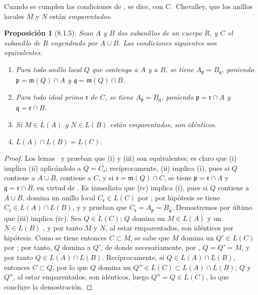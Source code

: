 \documentclass[oneside]{amsart}
\theoremstyle{ega-env-style}
\theoremstyle{ega-thm-env-style}
\newtheorem*{proposition}{Proposición}
\theoremstyle{ega-defn-env-style}
\let\EGAOriginalLabel\label
\renewcommand{\label}[1]{\phantomsection\EGAOriginalLabel{#1}}
\begin{document}
Cuando se cumplen las condiciones de , se dice, con C.~Chevalley, que los anillos locales $M$ y $N$ están \emph{emparentados}.

\begin{proposition}[8.1.5]
\label{I.8.1.5}
Sean $A$ y $B$ dos subanillos de un cuerpo $R$, y $C$ el subanillo de $R$ engendrado por $A\cup B$.
Las condiciones siguientes son equivalentes.
\begin{enumerate}
  \item[{\rm(i)}] Para todo anillo local $Q$ que contenga a $A$ y a $B$, se tiene $A_\mathfrak p=B_\mathfrak q$, poniendo $\mathfrak p=\mathfrak m(Q)\cap A$ y $\mathfrak q=\mathfrak m(Q)\cap B$.
  \item[{\rm(ii)}] Para todo ideal primo $\mathfrak r$ de $C$, se tiene $A_\mathfrak p=B_\mathfrak q$, poniendo $\mathfrak p=\mathfrak r\cap A$ y $\mathfrak q=\mathfrak r\cap B$.
  \item[{\rm(iii)}] Si $M\in L(A)$ y $N\in L(B)$ están emparentados, son idénticos.
  \item[{\rm(iv)}] $L(A)\cap L(B)=L(C)$.
\end{enumerate}
\end{proposition}

\begin{proof}
Los lemas~ y  prueban que (i) y (iii) son equivalentes;
es claro que (i) implica (ii) aplicándolo a $Q=C_\mathfrak r$;
recíprocamente, (ii) implica (i), pues si $Q$ contiene a $A\cup B$, contiene a $C$, y si $\mathfrak r=\mathfrak m(Q)\cap C$, se tiene $\mathfrak p=\mathfrak r\cap A$ y $\mathfrak q=\mathfrak r\cap B$, en virtud de .
Es inmediato que (iv) implica (i), pues si $Q$ contiene a $A\cup B$, domina un anillo local $C_\mathfrak r\in L(C)$ por ;
por hipótesis se tiene $C_\mathfrak r\in L(A)\cap L(B)$, y  y  prueban que $C_\mathfrak r=A_\mathfrak p=B_\mathfrak q$.
Demostremos por último que (iii) implica (iv).
Sea $Q\in L(C)$;
$Q$ domina un $M\in L(A)$ y un $N\in L(B)$ , y por tanto $M$ y $N$, al estar emparentados, son idénticos por hipótesis.
Como se tiene entonces $C\subset M$, se sabe que $M$ domina un $Q'\in L(C)$ por ; por tanto, $Q$ domina a $Q'$, de donde necesariamente, por , $Q=Q'=M$, y por tanto $Q\in L(A)\cap L(B)$.
Recíprocamente, si $Q\in L(A)\cap L(B)$, entonces $C\subset Q$, por lo que  $Q$ domina un $Q''\in L(C)\subset L(A)\cap L(B)$;
$Q$ y $Q''$, al estar emparentados, son idénticos, luego $Q''=Q\in L(C)$, lo que concluye la demostración.
\end{proof}
\end{document}
